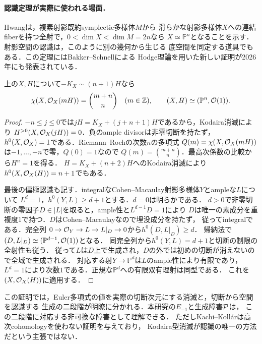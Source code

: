 \documentclass[11pt,a4paper]{ltjsarticle}
\begin{document}
\paragraph{認識定理が実際に使われる場面．}
Hwang\cite[Theorem 1.2]{HwangBase}は，複素射影既約symplectic多様体$M$から
滑らかな射影多様体$X$への連結fiberを持つ全射で，$0<\dim X<\dim M=2n$なら
$X\simeq\mathbb P^n$となることを示す．射影空間の認識は，このように別の幾何から生じる
底空間を同定する道具でもある．この定理にはBakker--Schnell\cite{BakkerSchnellHwang}による
Hodge理論を用いた新しい証明が2026年にも発表されている．

\begin{proposition}[最大指数からの標準Hilbert多項式]
上の$X,H$について$-K_X\sim(n+1)H$なら
\[
 \chi(X,\mathcal O_X(mH))=\binom{m+n}{n}\quad(m\in\mathbb Z),\qquad
 (X,H)\simeq(\mathbb P^n,\mathcal O(1)).
\]
\end{proposition}
\begin{proof}
$-n\leq j\leq0$では$jH=K_X+(j+n+1)H$であるから，Kodaira消滅により
$H^{>0}(X,\mathcal O_X(jH))=0$．負のample divisorは非零切断を持たず，
$h^0(X,\mathcal O_X)=1$である．Riemann--Rochの次数$n$の多項式
$Q(m)=\chi(X,\mathcal O_X(mH))$は$-1,\ldots,-n$で零，$Q(0)=1$なので
$Q(m)=\binom{m+n}{n}$．最高次係数の比較から$H^n=1$を得る．
$H=K_X+(n+2)H$へのKodaira消滅により$h^0(X,\mathcal O_X(H))=n+1$でもある．

最後の偏極認識も記す．integralなCohen--Macaulay射影多様体$Y$とampleな$L$について
$L^d=1$，$h^0(Y,L)\geq d+1$とする．$d=0$は明らかである．
$d>0$で非零切断の零因子$D\in|L|$を取ると，ample性と$L^{d-1}D=1$により
$D$は唯一の素成分を重複度$1$で持つ．$D$はCohen--Macaulayなので埋没成分を持たず，
従ってintegralである．完全列
$0\to\mathcal O_Y\to L\to L|_D\to0$から$h^0(D,L|_D)\geq d$．
帰納法で$(D,L|_D)\simeq(\mathbb P^{d-1},\mathcal O(1))$となる．
同完全列から$h^0(Y,L)=d+1$と切断の制限の全射性も従う．
従って$L$は$D$上で生成され，$D$の外では初めの切断が消えないので全域で生成される．
対応する射$Y\to\mathbb P^d$は$L$のample性により有限であり，
$L^d=1$により次数$1$である．正規な$\mathbb P^d$への有限双有理射は同型である．
これを$(X,\mathcal O_X(H))$に適用する．
\end{proof}

この証明では，Euler多項式の値を実際の切断次元にする消滅と，切断から空間を認識する
生成の二段階が明瞭に分かれる．本研究の$E_{-1}$と生成障害$\mathcal P$は，
この二段階に対応する非可換な障害として理解できる．
ただしKachi--Koll\'arは高次cohomologyを使わない証明を与えており，
Kodaira型消滅が認識の唯一の方法だという主張ではない．
\end{document}
